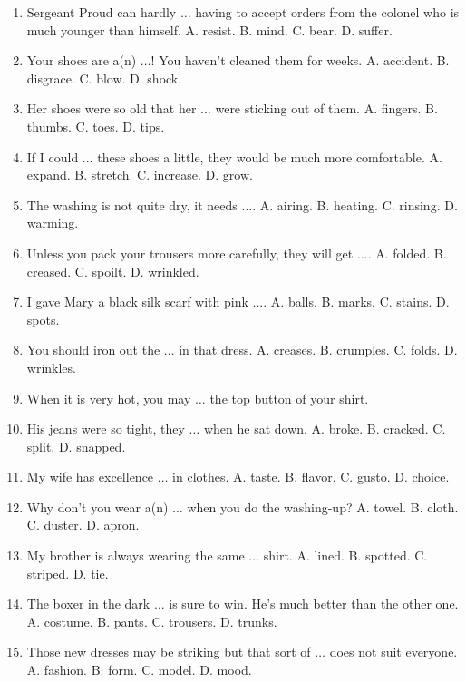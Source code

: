 \documentclass{article}
\numberwithin{equation}{section}
\begin{document}
\begin{enumerate}[leftmargin=8mm]
	\item Sergeant Proud can hardly $\ldots$ having to accept orders from the colonel who is much younger than himself. {\sf A.} resist. {\sf B.} mind. {\sf C.} bear. {\sf D.} suffer.
	\item Your shoes are a(n) $\ldots$! You haven't cleaned them for weeks. {\sf A.} accident. {\sf B.} disgrace. {\sf C.} blow. {\sf D.} shock.
	\item Her shoes were so old that her $\ldots$ were sticking out of them. {\sf A.} fingers. {\sf B.} thumbs. {\sf C.} toes. {\sf D.} tips.
	\item If I could $\ldots$ these shoes a little, they would be much more comfortable. {\sf A.} expand. {\sf B.} stretch. {\sf C.} increase. {\sf D.} grow.
	\item The washing is not quite dry, it needs $\ldots$. {\sf A.} airing. {\sf B.} heating. {\sf C.} rinsing. {\sf D.} warming.
	\item Unless you pack your trousers more carefully, they will get $\ldots$. {\sf A.} folded. {\sf B.} creased. {\sf C.} spoilt. {\sf D.} wrinkled.
	\item I gave Mary a black silk scarf with pink $\ldots$. {\sf A.} balls. {\sf B.} marks. {\sf C.} stains. {\sf D.} spots.
	\item You should iron out the $\ldots$ in that dress. {\sf A.} creases. {\sf B.} crumples. {\sf C.} folds. {\sf D.} wrinkles.
	\item When it is very hot, you may $\ldots$ the top button of your shirt.
	\item His jeans were so tight, they $\ldots$ when he sat down. {\sf A.} broke. {\sf B.} cracked. {\sf C.} split. {\sf D.} snapped.
	\item My wife has excellence $\ldots$ in clothes. {\sf A.} taste. {\sf B.} flavor. {\sf C.} gusto. {\sf D.} choice.
	\item Why don't you wear a(n) $\ldots$ when you do the washing-up? {\sf A.} towel. {\sf B.} cloth. {\sf C.} duster. {\sf D.} apron.
	\item My brother is always wearing the same $\ldots$ shirt. {\sf A.} lined. {\sf B.} spotted. {\sf C.} striped. {\sf D.} tie.
	\item The boxer in the dark $\ldots$ is sure to win. He's much better than the other one. {\sf A.} costume. {\sf B.} pants. {\sf C.} trousers. {\sf D.} trunks.
	\item Those new dresses may be striking but that sort of $\ldots$ does not suit everyone. {\sf A.} fashion. {\sf B.} form. {\sf C.} model. {\sf D.} mood.

\end{enumerate}
\end{document}
